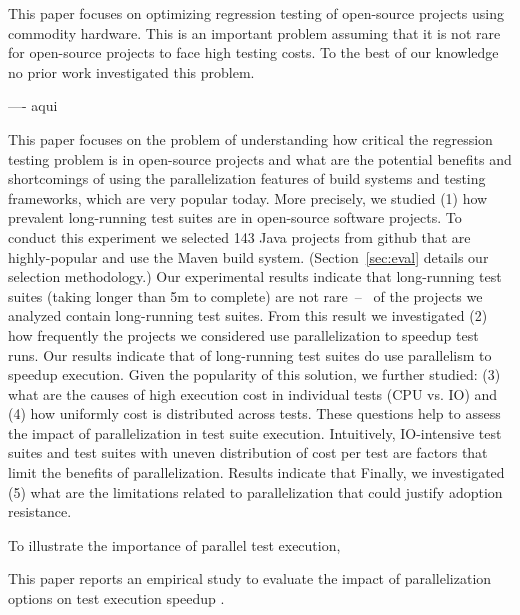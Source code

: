 This paper focuses on optimizing regression testing of open-source
projects using commodity hardware.  This is an important problem
assuming that it is not rare for open-source projects to face high
testing costs.   To the best
of our knowledge no prior work investigated this problem.

---- aqui

\newcommand{\numSubjs}{143}
\newcommand{\numLongRunning}{\Fix{17\%}}
\newcommand{\percentParallelForLongRunning}{\Fix{80\%}}


This paper focuses on the problem of understanding how critical the
regression testing problem is in open-source projects and what are the
potential benefits and shortcomings of using the parallelization
features of build systems and testing frameworks, which are very
popular today.  More precisely, we studied (1) how
prevalent long-running test suites are in open-source software
projects.  To conduct this experiment we selected \numSubjs{} Java
projects from github that are highly-popular and use the Maven build
system.  (Section~\ref{sec:eval} details our selection methodology.)
Our experimental results indicate that long-running test suites
(taking longer than 5m to complete) are not
rare~--~\numLongRunning{} of the projects we analyzed contain
long-running test suites.  
From this result we investigated (2) how frequently the projects we
considered use parallelization to speedup test runs.  Our results
indicate that \percentParallelForLongRunning{} of long-running test
suites do use parallelism to speedup execution.  Given the popularity
of this solution, we further studied: (3) what are the causes of high
execution cost in individual tests (CPU vs. IO) and (4) how uniformly
cost is distributed across tests.  These questions help to assess the
impact of parallelization in test suite execution.  Intuitively,
IO-intensive test suites and test suites with uneven distribution of
cost per test are factors that limit the benefits of parallelization.
Results indicate that   Finally, we investigated (5) what are
the limitations related to parallelization that could justify adoption
resistance.

\Fix{--------------}

To illustrate the importance of parallel test execution, 

This paper reports an empirical study to evaluate the impact of
parallelization options on test execution speedup  .

